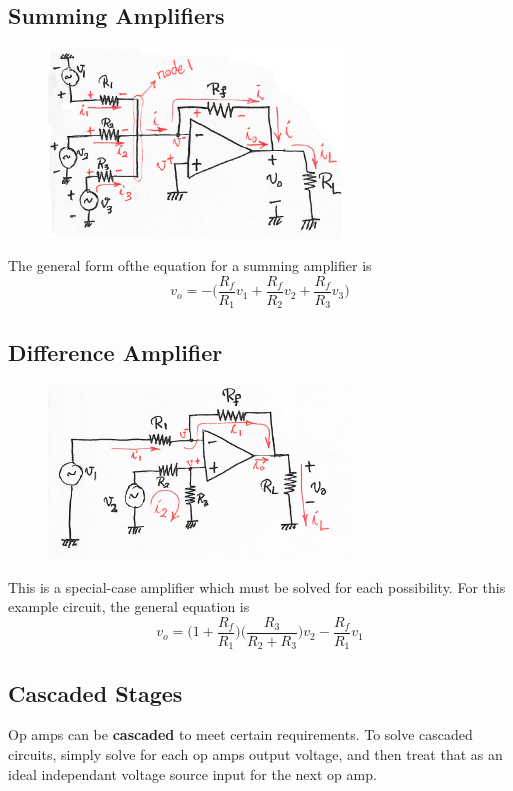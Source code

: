 \documentclass[12pt]{article}
\begin{document}
\subsection*{Summing Amplifiers}

\begin{figure}[ht]
\centering
\includegraphics[width=0.7\textwidth]{summingamp.png}
\end{figure}

The general form ofthe equation for a summing amplifier is \[ v_o = -\bigg(\frac{R_f}{R_1}v_1 + \frac{R_f}{R_2}v_2 + \frac{R_f}{R_3}v_3\bigg) \]

\subsection*{Difference Amplifier}

\begin{figure}[ht]
\centering
\includegraphics[width=0.7\textwidth]{differenceamp.png}
\end{figure}

This is a special-case amplifier which must be solved for each possibility. For this example circuit, the general equation is \[ v_o = \bigl(1 + \frac{R_f}{R_1}\bigl)\bigl(\frac{R_3}{R_2+R_3}\bigl)v_2 - \frac{R_f}{R_1}v_1 \]

\subsection*{Cascaded Stages}
Op amps can be {\bf cascaded} to meet certain requirements. To solve cascaded circuits, simply solve for each op amps output voltage, and then treat that as an ideal independant voltage source input for the next op amp.
\end{document}
